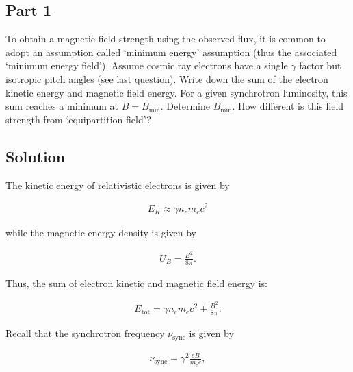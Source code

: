 \documentclass[12pt]{article}
\begin{document}

\subsection*{Part 1}

To obtain a magnetic field strength using the observed flux, it is common to adopt an assumption called `minimum energy' assumption (thus the associated `minimum energy field'). Assume cosmic ray electrons have a single $\gamma$ factor but isotropic pitch angles (see last question). Write down the sum of the electron kinetic energy and magnetic field energy. For a given synchrotron luminosity, this sum reaches a minimum at $B = B_\mathrm{min}$. Determine $B_\mathrm{min}$. How different is this field strength from `equipartition field'?


\subsection*{Solution}

The kinetic energy of relativistic electrons is given by

\begin{align*}
    E_K \approx \gamma n_e m_ec^2
\end{align*}

{\noindent}while the magnetic energy density is given by

\begin{align*}
    U_B = \frac{B^2}{8\pi}.
\end{align*}

{\noindent}Thus, the sum of electron kinetic and magnetic field energy is:

\begin{align*}
    \boxed{E_\mathrm{tot} = \gamma n_e m_ec^2 + \frac{B^2}{8\pi}}.
\end{align*}

{\noindent}Recall that the synchrotron frequency $\nu_\mathrm{sync}$ is given by

\begin{align*}
    \nu_\mathrm{sync} = \gamma^2 \frac{eB}{m_ec},
\end{align*}
\end{document}
